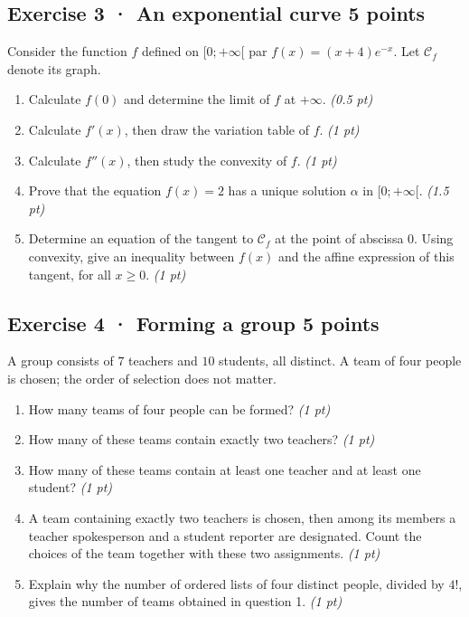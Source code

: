 \clearpage{}\par

\subsection*{Exercise 3 · An exponential curve \hfill 5 points}Consider the function $f$ defined on $[0;+\infty[$ par $f(x)=(x+4)e^{-x}$. Let $\mathcal C_f$ denote its graph.

\begin{enumerate}

\item Calculate $f(0)$ and determine the limit of $f$ at $+\infty$. \hfill\textit{(0.5 pt)}

\item Calculate $f'(x)$, then draw the variation table of $f$. \hfill\textit{(1 pt)}

\item Calculate $f''(x)$, then study the convexity of $f$. \hfill\textit{(1 pt)}

\item Prove that the equation $f(x)=2$ has a unique solution $\alpha$ in $[0;+\infty[$. \hfill\textit{(1.5 pt)}

\item Determine an equation of the tangent to $\mathcal C_f$ at the point of abscissa $0$. Using convexity, give an inequality between $f(x)$ and the affine expression of this tangent, for all $x\ge0$. \hfill\textit{(1 pt)}

\end{enumerate}

\subsection*{Exercise 4 · Forming a group \hfill 5 points}A group consists of $7$ teachers and $10$ students, all distinct. A team of four people is chosen; the order of selection does not matter.

\begin{enumerate}

\item How many teams of four people can be formed? \hfill\textit{(1 pt)}

\item How many of these teams contain exactly two teachers? \hfill\textit{(1 pt)}

\item How many of these teams contain at least one teacher and at least one student? \hfill\textit{(1 pt)}

\item A team containing exactly two teachers is chosen, then among its members a teacher spokesperson and a student reporter are designated. Count the choices of the team together with these two assignments. \hfill\textit{(1 pt)}

\item Explain why the number of ordered lists of four distinct people, divided by $4!$, gives the number of teams obtained in question 1. \hfill\textit{(1 pt)}

\end{enumerate}

